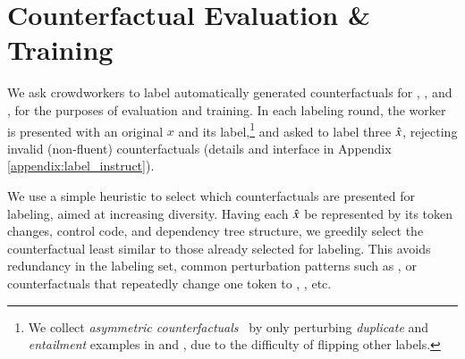 \section{Counterfactual Evaluation \& Training}
\label{sec:app_label}

We ask crowdworkers to label automatically generated counterfactuals for \sst, \nli, and \qqp, for the purposes of evaluation and training. In each labeling round, the worker is presented with an original $x$ and its label,\footnote{We collect \emph{asymmetric counterfactuals}~\cite{garg2019counterfactual} by only perturbing \emph{duplicate} and \emph{entailment} examples in \qqp and \nli, due to the difficulty of flipping other labels.} and asked to label three $\hat{x}$, rejecting invalid (non-fluent) counterfactuals (details and interface in Appendix \ref{appendix:label_instruct}).

We use a simple heuristic to select which counterfactuals are presented for labeling, aimed at increasing diversity. Having each $\hat{x}$ be represented by its token changes, control code, and dependency tree structure, we greedily select the counterfactual least similar to those already selected for labeling. This avoids redundancy in the labeling set, \eg common perturbation patterns such as , or counterfactuals that repeatedly change one token  to , , etc.


